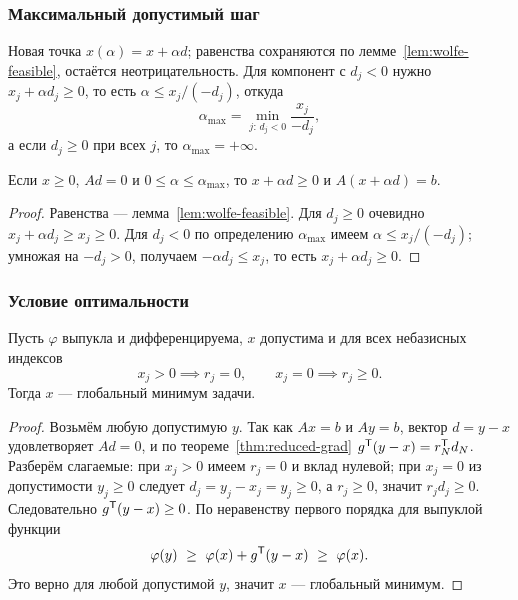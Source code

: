 \subsubsection*{Максимальный допустимый шаг}

Новая точка $x(\alpha) = x + \alpha d$; равенства сохраняются по
лемме~\ref{lem:wolfe-feasible}, остаётся неотрицательность. Для компонент с
$d_j < 0$ нужно $x_j + \alpha d_j \ge 0$, то есть $\alpha \le x_j/(-d_j)$,
откуда
\[
  \alpha_{\max} = \min_{j :\, d_j < 0} \frac{x_j}{-d_j} ,
\]
а если $d_j \ge 0$ при всех $j$, то $\alpha_{\max} = +\infty$.

\begin{theorem}\label{thm:wolfe-step}
Если $x \ge 0$, $Ad = 0$ и $0 \le \alpha \le \alpha_{\max}$, то
$x + \alpha d \ge 0$ и $A(x + \alpha d) = b$.
\end{theorem}

\begin{proof}
Равенства — лемма~\ref{lem:wolfe-feasible}. Для $d_j \ge 0$ очевидно
$x_j + \alpha d_j \ge x_j \ge 0$. Для $d_j < 0$ по определению $\alpha_{\max}$
имеем $\alpha \le x_j/(-d_j)$; умножая на $-d_j > 0$, получаем
$-\alpha d_j \le x_j$, то есть $x_j + \alpha d_j \ge 0$.
\end{proof}

\subsubsection*{Условие оптимальности}

\begin{theorem}\label{thm:wolfe-opt}
Пусть $\varphi$ выпукла и дифференцируема, $x$ допустима и для всех
небазисных индексов
\[
  x_j > 0 \implies r_j = 0 ,
  \qquad
  x_j = 0 \implies r_j \ge 0 .
\]
Тогда $x$ — глобальный минимум задачи.
\end{theorem}

\begin{proof}
Возьмём любую допустимую $y$. Так как $Ax = b$ и $Ay = b$, вектор
$d = y - x$ удовлетворяет $Ad = 0$, и по теореме~\ref{thm:reduced-grad}
$g^{\mathsf{T}}(y - x) = r_N^{\mathsf{T}} d_N$. Разберём слагаемые: при $x_j > 0$ имеем $r_j = 0$ и
вклад нулевой; при $x_j = 0$ из допустимости $y_j \ge 0$ следует
$d_j = y_j - x_j = y_j \ge 0$, а $r_j \ge 0$, значит $r_j d_j \ge 0$.
Следовательно $g^{\mathsf{T}}(y-x) \ge 0$. По неравенству первого порядка для выпуклой
функции
\[
  \varphi(y) \ \ge\ \varphi(x) + g\T(y - x) \ \ge\ \varphi(x) .
\]
Это верно для любой допустимой $y$, значит $x$ — глобальный минимум.
\end{proof}

